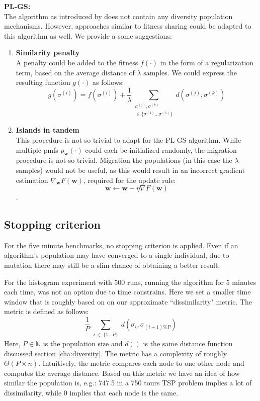 \documentclass[a4paper,10pt]{article}
\begin{document}
	\textbf{PL-GS:} \\
	The algorithm as introduced by \citeauthor{santucci_gradient_2020} does not contain any diversity population mechanisms. However, approaches similar to fitness sharing could be adapted to this algorithm as well. We provide a some suggestions:
	\begin{enumerate}
		\item \textbf{Similarity penalty} \\ 
		A penalty could be added to the fitness $f(\cdot)$ in the form of a regularization term, based on the average distance of $\lambda$ samples. We could express the resulting function $g(\cdot)$ as follows:
		$$
		g(\sigma^{(i)}) = f(\sigma^{(i)}) + \frac{1}{\lambda} \sum_{\substack{\sigma^{(j)}, \sigma^{(k)} \\ \in \{ \sigma^{(1)} \dots \sigma^{(\lambda)} \}}} d(\sigma^{(j)}, \sigma^{(k)})
		$$
		\item \textbf{Islands in tandem} \\
		This procedure is not so trivial to adapt for the PL-GS algorithm. While multiple pmfs $p_\mathbf{w}(\cdot)$ could each be initialized randomly, the migration procedure is not so trivial. Migration the populations (in this case the $\lambda$ samples) would not be useful, as this would result in an incorrect gradient estimation $\nabla_{\mathbf{w}} F\left(\mathbf{w}\right)$, required for the update rule:
		$$\mathbf{w} \leftarrow \mathbf{w} - \eta \nabla F\left(\mathbf{w}\right)$$.
		
		
	\end{enumerate}
	


\subsection{Stopping criterion}
For the five minute benchmarks, no stopping criterion is applied. Even if an algorithm's population may have converged to a single individual, due to mutation there may still be a slim chance of obtaining a better result. 

For the histogram experiment with 500 runs, running the algorithm for 5 minutes each time, was not an option due to time constrains. Here we set a smaller time window that is roughly based on on our approximate ``dissimilarity" metric. The metric is defined as follows:
$$
\frac{1}{P} \sum_{\substack{i~\in~\{1 \dots P \}}} d(\sigma_i, \sigma_{(i+1) \% P})
$$
Here, $P \in \mathbb{N}$ is the population size and $d()$ is the same distance function discussed section \ref{cha:diversity}. The metric has a complexity of roughly $\Theta(P \times n)$.
Intuitively, the metric compares each node to one other node and computes the average distance. Based on this metric we have an idea of how similar the population is, e.g.: 747.5 in a 750 tours TSP problem implies a lot of dissimilarity, while 0 implies that each node is the same.
\end{document}
